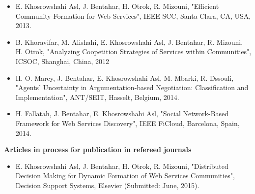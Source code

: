 \begin{itemize}
\item E. Khosrowshahi Asl, J. Bentahar, H. Otrok, R. Mizouni, "Efficient Community Formation for Web Services", IEEE SCC, Santa Clara, CA, USA, 2013.

\item B. Khoravifar, M. Alishahi, E. Khosrowshahi Asl, J. Bentahar, R. Mizouni, H. Otrok, "Analyzing Coopetition Strategies of Services within Communities", ICSOC, Shanghai, China, 2012

\item H. O. Marey, J. Bentahar, E. Khosrowshahi Asl, M. Mbarki, R. Dssouli, "Agents' Uncertainty in Argumentation-based Negotiation: Classification and Implementation", ANT/SEIT, Hasselt, Belgium, 2014.
    
\item H. Fallatah, J. Bentahar, E. Khosrowshahi Asl, "Social Network-Based Framework for Web Services Discovery", IEEE  FiCloud, Barcelona, Spain, 2014.
    

\end{itemize}

\textbf{Articles in process for publication in refereed journals}

\begin{itemize}
\item E. Khosrowshahi Asl, J. Bentahar, H. Otrok, R. Mizouni, "Distributed Decision Making for Dynamic Formation of Web Services Communities", Decision Support Systems, Elsevier (Submitted: June, 2015).
\end{itemize}

